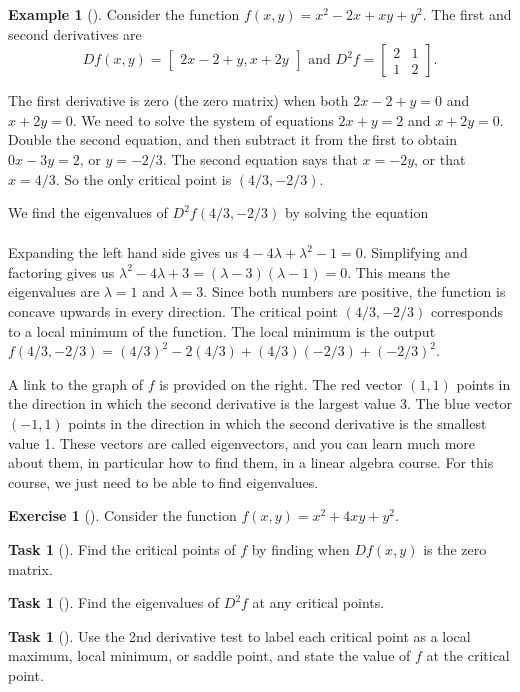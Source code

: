 \documentclass[10pt,]{book}
\theoremstyle{plain}
\theoremstyle{definition}
\theoremstyle{definition}
\theoremstyle{definition}
\newtheorem{example}[theorem]{Example}
\theoremstyle{definition}
\newtheorem{exploration}[project]{Exercise}
\newtheorem{task}[project]{Task}
\theoremstyle{definition}
\numberwithin{equation}{section}
\newcommand{\amp}{&}
\begin{document}
\begin{example}[]\label{example-2}
Consider the function \(f(x,y)=x^2-2x+xy+y^2\). The first and second derivatives are%
\begin{equation*}
Df(x,y)=\begin{bmatrix}2x-2+y,x+2y
\end{bmatrix} 
\text{ and }  
D^2f = \begin{bmatrix}2\amp 1 \\1\amp 2
\end{bmatrix} .
\end{equation*}
%
\par
The first derivative is zero (the zero matrix) when both \(2x-2+y=0\) and \(x+2y=0\). We need to solve the system of equations \(2x+y=2\) and \(x+2y=0\). Double the second equation, and then subtract it from the first to obtain \(0x-3y=2\), or \(y=-2/3\). The second equation says that \(x=-2y\), or that \(x=4/3\). So the only critical point is \((4/3,-2/3)\).%
\par
We find the eigenvalues of \(D^2 f(4/3,-2/3)\) by solving the equation%
\begin{align*}

\end{align*}
%
\par
Expanding the left hand side gives us {\(4-4\lambda + \lambda^2 -1 = 0\)}. Simplifying and factoring gives us \(\lambda^2-4\lambda +3 = (\lambda-3)(\lambda -1) = 0\). This means the eigenvalues are \(\lambda = 1\) and \(\lambda=3\). Since both numbers are positive, the function is concave upwards in every direction. The critical point \((4/3,-2/3)\) corresponds to a local minimum of the function. The local minimum is the output \(f(4/3,-2/3) = (4/3)^2-2(4/3)+(4/3)(-2/3)+(-2/3)^2\).%
\par
A link to the graph of \(f\) is provided on the right. The red vector \((1,1)\) points in the direction in which the second derivative is the largest value 3. The blue vector \((-1,1)\) points in the direction in which the second derivative is the smallest value 1. These vectors are called eigenvectors, and you can learn much more about them, in particular how to find them, in a linear algebra course. For this course, we just need to be able to find eigenvalues.%
\end{example}
\begin{exploration}[]\label{exploration-236}
Consider the function \(f(x,y)=x^2+4xy+y^2\).%
\begin{task}[]\label{task-630}
Find the critical points of \(f\) by finding when \(Df(x,y)\) is the zero matrix.%
\end{task}
\begin{task}[]\label{task-631}
Find the eigenvalues of \(D^2f\) at any critical points.%
\end{task}
\begin{task}[]\label{task-632}
Use the 2nd derivative test to label each critical point as a local maximum, local minimum, or saddle point, and state the value of \(f\) at the critical point.%
\end{task}
\end{exploration}
\end{document}
